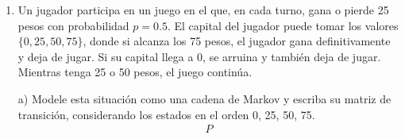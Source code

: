 \documentclass[a4paper, 12pt]{article}
\newcommand{\Aspace}{0.2cm}
\begin{document}
\begin{enumerate}
            \vspace{\Aspace} \par
            c) ¿Cuál es la distribución estacionaria?
            \\ { \color{azul} 
                \(
                    \\ $ \pi P = \pi $ \\
                    \begin{array}{cccc}
                        \begin{bmatrix}
                            \pi G   &   \pi P
                        \end{bmatrix}
                    
                        \begin{bmatrix}
                            0{.}7   &   0{.}3   \\
                            0{.}4   &   0{.}6                       
                        \end{bmatrix}

                        =

                        \begin{bmatrix}
                            \pi G   &   \pi P
                        \end{bmatrix}                   
                    \end{array}
                \)
            }

            \vspace{\Aspace} \par
            d) ¿Cuál es la distribución de probabilidad después de muchos partidos?
            \\ { \color{azul}  }

        
        \newpage
    \item Un jugador participa en un juego en el que, en cada turno, gana o pierde 25 pesos con probabilidad $p = 0{.}5$. El capital del jugador puede tomar los valores $\{0, 25, 50, 75\}$, donde si alcanza los 75 pesos, el jugador gana definitivamente y deja de jugar. Si su capital llega a 0, se arruina y también deja de jugar. Mientras tenga 25 o 50 pesos, el juego continúa.
            \vspace{\Aspace} \par
            a) Modele esta situación como una cadena de Markov y escriba su matriz de transición, considerando los estados en el orden 0, 25, 50, 75.
            \\ { \color{azul} 
                \[
                    \begin{array}{ccc}
                        P


\end{array}\]}
\end{enumerate}
\end{document}
